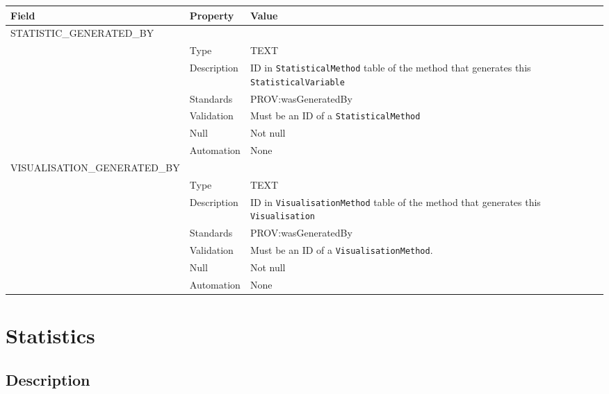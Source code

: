 \documentclass[
]{article}
\newcounter{none}
\begin{document}
{\def\LTcaptype{none} 
\begin{longtable}[]{@{}
  >{\raggedright\arraybackslash}p{}
  >{\raggedright\arraybackslash}p{}
  >{\raggedright\arraybackslash}p{}@{}}
\toprule\noalign{}
\begin{minipage}[b]{\linewidth}\raggedright
Field
\end{minipage} & \begin{minipage}[b]{\linewidth}\raggedright
Property
\end{minipage} & \begin{minipage}[b]{\linewidth}\raggedright
Value
\end{minipage} \\
\midrule\noalign{}
\endhead
\bottomrule\noalign{}
\endlastfoot
STATISTIC\_GENERATED\_BY & & \\
& Type & TEXT \\
& Description & ID in \texttt{StatisticalMethod} table of the method
that generates this \texttt{StatisticalVariable} \\
& Standards & PROV:wasGeneratedBy \\
& Validation & Must be an ID of a \texttt{StatisticalMethod} \\
& Null & Not null \\
& Automation & None \\
VISUALISATION\_GENERATED\_BY & & \\
& Type & TEXT \\
& Description & ID in \texttt{VisualisationMethod} table of the method
that generates this \texttt{Visualisation} \\
& Standards & PROV:wasGeneratedBy \\
& Validation & Must be an ID of a \texttt{VisualisationMethod}. \\
& Null & Not null \\
& Automation & None \\
\end{longtable}
}

\section{Statistics}\label{statistics}

\subsection{Description}\label{description-31}
\end{document}
